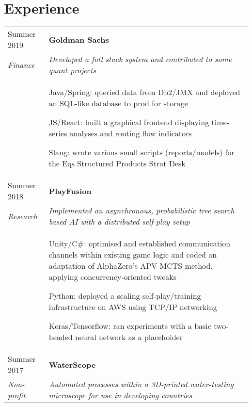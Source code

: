 \documentclass[letterpaper, 10pt]{article}
\begin{document}
{%
\section*{Experience}
\begin{tabularx}{\linewidth}{>{\raggedleft}p{2.1cm}|X}
Summer 2019			& \textbf{Goldman Sachs}\\
\textit{Finance}	& \textit{Developed a full stack system and contributed to some quant projects}\\
					& \vspace{-.5\baselineskip}\begin{compact}
						\item Java/Spring: queried data from Db2/JMX and deployed an SQL-like database to prod for storage
						\item JS/React: built a graphical frontend displaying time-series analyses and routing flow indicators
						\item Slang: wrote various small scripts (reports/models) for the Eqs Structured Products Strat Desk
						\vspace{-1.5\baselineskip}
					\end{compact}\\
Summer 2018	& \textbf{PlayFusion}\\
\textit{Research}	& \textit{Implemented an asynchronous, probabilistic tree search based AI with a distributed self-play setup}\\
					& \vspace{-.5\baselineskip}\begin{compact}
						\item Unity/C\#: optimised and established communication channels within existing game logic and coded an adaptation of AlphaZero's APV-MCTS method, applying concurrency-oriented tweaks
						\item Python: deployed a scaling self-play/training infrastructure on AWS using TCP/IP networking
						\item Keras/Tensorflow: ran experiments with a basic two-headed neural network as a placeholder
						\vspace{-.5\baselineskip}
					\end{compact}\\
Summer 2017	& \textbf{WaterScope}\\
\textit{Non-profit}	& \textit{Automated processes within a 3D-printed water-testing microscope for use in developing countries}\\

\end{tabularx}}
\end{document}

